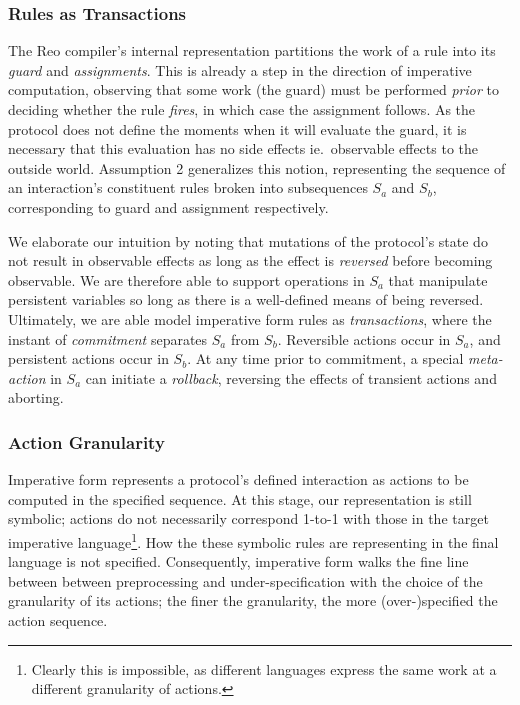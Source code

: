\subsubsection{Rules as Transactions}

The Reo compiler's internal representation partitions the work of a rule into its \textit{guard} and \textit{assignments}. This is already a step in the direction of imperative computation, observing that some work (the guard) must be performed \textit{prior} to deciding whether the rule \textit{fires}, in which case the assignment follows. As the protocol does not define the moments when it will evaluate the guard, it is necessary that this evaluation has no side effects ie.\ observable effects to the outside world. Assumption 2 generalizes this notion, representing the sequence of an interaction's constituent rules broken into subsequences $S_a$ and $S_b$, corresponding to guard and assignment respectively.

We elaborate our intuition by noting that mutations of the protocol's state do not result in observable effects as long as the effect is \textit{reversed} before becoming observable. We are therefore able to support operations in $S_a$ that manipulate persistent variables so long as there is a well-defined means of being reversed. Ultimately, we are able model imperative form rules as \textit{transactions}, where the instant of \textit{commitment} separates $S_a$ from $S_b$. Reversible actions occur in $S_a$, and persistent actions occur in $S_b$. At any time prior to commitment, a special \textit{meta-action} in $S_a$ can initiate a \textit{rollback}, reversing the effects of transient actions and aborting.

\subsubsection{Action Granularity}

Imperative form represents a protocol's defined interaction as actions to be computed in the specified sequence. At this stage, our representation is still symbolic; actions do not necessarily correspond 1-to-1 with those in the target imperative language\footnote{Clearly this is impossible, as different languages express the same work at a different granularity of actions.}. How the these symbolic rules are representing in the final language is not specified. Consequently, imperative form walks the fine line between between preprocessing and under-specification with the choice of the granularity of its actions; the finer the granularity, the more (over-)specified the action sequence. 

